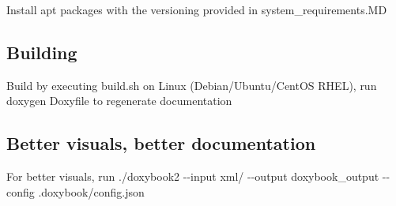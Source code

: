 Install apt packages with the versioning provided in {\ttfamily system\+\_\+requirements.\+MD}

\subsection*{Building}

Build by executing build.\+sh on Linux (Debian/\+Ubuntu/\+Cent\+OS R\+H\+EL), run {\ttfamily doxygen Doxyfile} to regenerate documentation

\subsection*{Better visuals, better documentation}

For better visuals, run {\ttfamily ./doxybook2 -\/-\/input xml/ -\/-\/output doxybook\+\_\+output -\/-\/config .doxybook/config.\+json} 